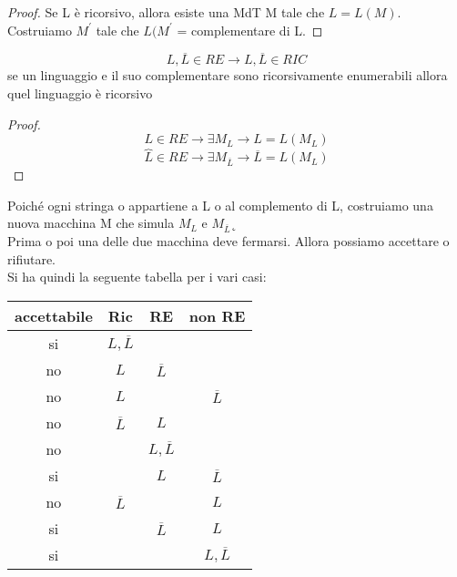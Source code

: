\documentclass[a4paper,12pt, oneside]{book}
\begin{document}
	\begin{proof}
		Se L è ricorsivo, allora esiste una MdT M tale che $L = L(M)$. Costruiamo $M^{'}$ tale che
		$L(M^{'}$ = complementare di L.
	\end{proof}
	\begin{teorema}
		$$L,\overline{L}\in RE\to L,\overline{L}\in RIC$$
		se un linguaggio e il suo complementare sono ricorsivamente enumerabili allora quel linguaggio è ricorsivo
	\end{teorema}
	\begin{proof}
		$$L\in RE\to \exists M_L\to L=L(M_L)$$
		$$\overbrace{L}\in RE\to \exists M_{\overline{L}}\to \overline{L}=L(M_L)$$
	\end{proof}
	Poiché ogni stringa o appartiene a L o al complemento di L, costruiamo una nuova macchina M che
	simula $M_L$ e $M_{\overline{L}}$˛\\Prima o poi una delle due macchina deve fermarsi. Allora possiamo accettare o rifiutare.\\
	Si ha quindi la seguente tabella per i vari casi:
	\begin{center}
		\begin{tabular}{c c c c }
			accettabile & Ric              & RE               & non RE           \\
			\hline
			si          & $L,\overline{L}$ &                  &                  \\
			no          & $L$              & $\overline{L}$   &                  \\
			no          & $L$              &                  & $\overline{L}$   \\
			no          & $\overline{L}$   & $L$              &                  \\
			no          &                  & $L,\overline{L}$ &                  \\
			si          &                  & $L$              & $\overline{L}$   \\
			no          & $\overline{L}$   &                  & $L$              \\
			si          &                  & $\overline{L}$   & $L$              \\
			si          &                  &                  & $L,\overline{L}$ \\
		\end{tabular}
	\end{center}
\end{document}
